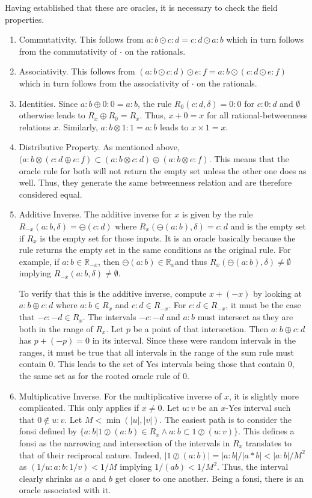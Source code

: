\documentclass[12pt]{article}
\begin{document}
Having established that these are oracles, it is necessary to check the field properties. 
\begin{enumerate}
    \item Commutativity. This follows from $a:b \odot c:d = c:d \odot a:b$ which in turn follows from the commutativity of $\cdot$ on the rationals. 
    \item Associativity. This follows from $(a:b \odot c:d) \odot e:f = a:b \odot (c:d \odot e:f)$ which in turn follows from the associativity of $\cdot$ on the rationals. 
    \item Identities. Since $a:b \oplus 0:0 = a:b$, the rule $R_0 (c:d, \delta) = 0:0$ for $c:0:d$ and $\emptyset$ otherwise leads to $R_x \oplus R_0 = R_x$. Thus, $x + 0 = x$ for all rational-betweenness relations $x$. Similarly, $a:b \otimes 1:1 = a:b$ leads to $x \times 1 = x$. 
    \item Distributive Property. As mentioned above, $( a:b \otimes ( c:d \oplus e:f) \subset (a:b \otimes c:d) \oplus (a:b \otimes e:f)$. This means that the oracle rule for both will not return the empty set unless the other one does as well. Thus, they generate the same betweenness relation and are therefore considered equal. 
    \item Additive Inverse.  The additive inverse for $x$ is given by the rule $R_{-x}(a:b, \delta) = \ominus (c:d)$ where $R_x (\ominus (a:b), \delta) = c:d$  and is the empty set if $R_x$ is the empty set for those inputs. It is an oracle basically because the rule returns the empty set in the same conditions as the original rule. For example, if $a:b \in \mathbb{R}_{-x}$, then $\ominus (a:b) \in \mathbb{R}_x$and thus $R_x(\ominus (a:b), \delta) \neq \emptyset$ implying $R_{-x} (a:b, \delta) \neq \emptyset$.

    To verify that this is the additive inverse, compute $x + (-x)$ by looking at $a:b \oplus c:d$ where $a:b \in R_x$ and $c:d \in R_{-x}$. For $c:d \in R_{-x}$, it must be the case that $-c:-d \in R_x$. The intervals $-c:-d$ and $a:b$ must intersect as they are both in the range of $R_x$. Let $p$ be a point of that intersection. Then $a:b \oplus c:d$ has $p + (-p) =0$ in its interval. Since these were random intervals in the ranges, it must be true that all intervals in the range of the sum rule must contain 0. This leads to the set of Yes intervals being those that contain 0, the same set as for the rooted oracle rule of 0. 
    
    \item Multiplicative Inverse. For the multiplicative inverse of $x$, it is slightly more complicated. This only applies if $x \neq 0$. Let $u:v$ be an $x$-Yes interval such that $0 \notin u:v$. Let $M < \min(|u|, |v|)$. 
    The easiest path is to consider the fonsi defined by $\{ a:b | 1 \oslash (a:b) \in R_x \wedge a:b \subset 1 \oslash (u:v) \}$. This defines a fonsi as the narrowing and intersection of the intervals in $R_x$ translates to that of their reciprocal nature. Indeed, $|1 \oslash (a:b)| = |a:b|/|a*b| < |a:b|/M^2$ as $(1/u : a : b: 1/v) < 1/M$ implying $1/(ab)< 1/M^2$. Thus, the interval clearly shrinks as $a$ and $b$ get closer to one another. Being a fonsi, there is an oracle associated with it. 


\end{enumerate}
\end{document}
